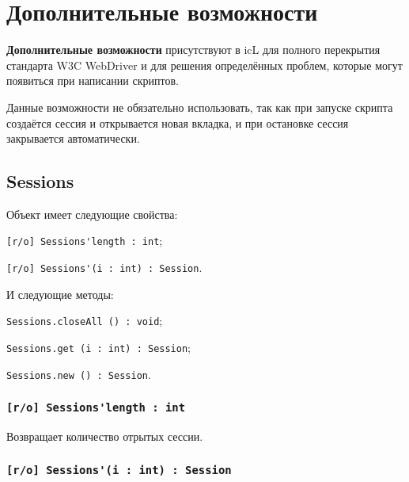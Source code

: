 \section{Дополнительные возможности}

{\bf Дополнительные возможности} присутствуют в icL для полного перекрытия стандарта W3C WebDriver и для решения определённых проблем, которые могут появиться при написании скриптов.

Данные возможности не обязательно использовать, так как при запуске скрипта создаётся сессия и открывается новая вкладка, и при остановке сессия закрывается автоматически.


\subsection{{\color{orange} Sessions}}

Объект \sessions{} имеет следующие свойства:
\begin{icItems}
	\item \lstinline|[r/o] Sessions'length : int|;
	\item \lstinline|[r/o] Sessions'(i : int) : Session|.
\end{icItems}

И следующие методы:
\begin{icItems}
	\item \lstinline|Sessions.closeAll () : void|;
	\item \lstinline|Sessions.get (i : int) : Session|;
	\item \lstinline|Sessions.new () : Session|.
\end{icItems}

\subsubsection{\lstinline|[r/o] Sessions'length : int|}

Возвращает количество отрытых сессии.

\subsubsection{\lstinline|[r/o] Sessions'(i : int) : Session|}

